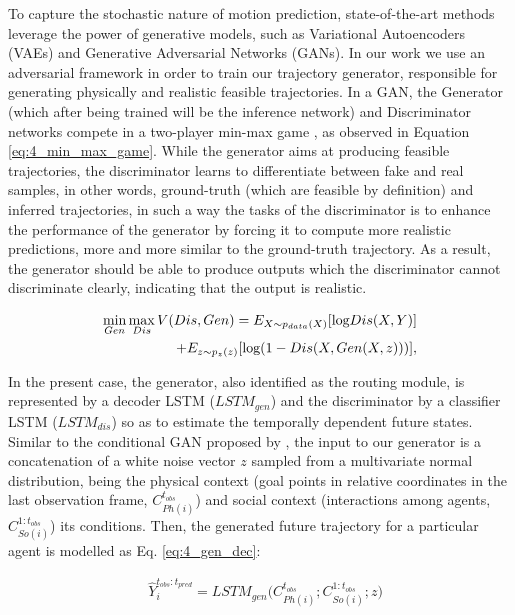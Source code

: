 To capture the stochastic nature of motion prediction, state-of-the-art methods leverage the power of generative models, such as Variational Autoencoders (VAEs) and Generative Adversarial Networks (GANs). In our work we use an adversarial framework in order to train our trajectory generator, responsible for generating physically and realistic feasible trajectories. In a GAN, the Generator (which after being trained will be the inference network) and Discriminator networks compete in a two-player min-max game \cite{goodfellow2020generative}, as observed in Equation \ref{eq:4_min_max_game}. While the generator aims at producing feasible trajectories, the discriminator learns to differentiate between fake and real samples, in other words, ground-truth (which are feasible by definition) and inferred trajectories, in such a way the tasks of the discriminator is to enhance the performance of the generator by forcing it to compute more realistic predictions, more and more similar to the ground-truth trajectory. As a result, the generator should be able to produce outputs which the discriminator cannot discriminate clearly, indicating that the output is realistic. 

\begin{eqnarray}
	\label{eq:4_min_max_game}
	&&\hspace{-10mm} \min_{Gen} \max_{Dis} V(Dis, Gen)=E_{X \sim p_{data}(X)}[\mbox{log} Dis(X,Y)] \nonumber \\
	&&\hspace{15mm} + E_{z \sim p_z(z)}[\mbox{log} (1 - Dis(X, Gen(X,z)))],
\end{eqnarray}

In the present case, the generator, also identified as the routing module, is represented by a decoder LSTM  ($LSTM_{gen}$) and the discriminator by a classifier LSTM ($LSTM_{dis}$) so as to estimate the temporally dependent future states. Similar to the conditional GAN proposed by \cite{sadeghian2019sophie}, the input to our generator is a concatenation of a white noise vector $z$ sampled from a multivariate normal distribution, being the physical context (goal points in relative coordinates in the last observation frame, $C_{Ph(i)}^{t_{obs}}$) and social context (interactions among agents, $C_{So(i)}^{1:t_{obs}}$) its conditions. Then, the generated future trajectory for a particular agent is modelled as Eq. \ref{eq:4_gen_dec}:

\begin{eqnarray}
	\label{eq:4_gen_dec}
	& \hat{Y}_i^{t_{obs}:t_{pred}} = LSTM_{gen}\big(C_{Ph(i)}^{t_{obs}}; C_{So(i)}^{1:t_{obs}}; z\big)
\end{eqnarray}

